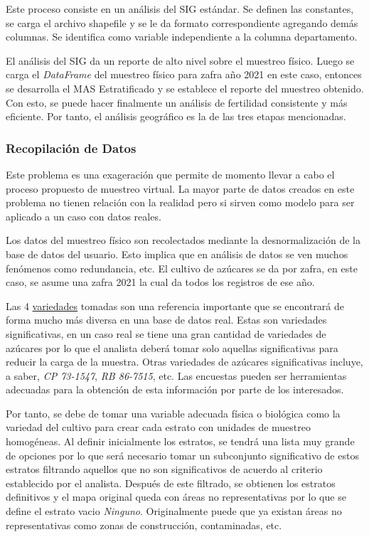 Este proceso consiste en un análisis del SIG estándar. Se definen las constantes, se carga el archivo shapefile y se le da formato correspondiente agregando demás columnas. Se identifica como variable independiente a la columna departamento.

\bigbreak

El análisis del SIG da un reporte de alto nivel sobre el muestreo físico. Luego se carga el \textit{DataFrame} del muestreo físico para zafra año 2021 en este caso, entonces se desarrolla el MAS Estratificado y se establece el reporte del muestreo obtenido. Con esto, se puede hacer finalmente un análisis de fertilidad consistente y más eficiente. Por tanto, el análisis geográfico es la de las tres etapas mencionadas.

\subsubsection{Recopilación de Datos}

Este problema es una exageración que permite de momento llevar a cabo el proceso propuesto de muestreo virtual. La mayor parte de datos creados en este problema no tienen relación con la realidad pero si sirven como modelo para ser aplicado a un caso con datos reales.

\bigbreak

Los datos del muestreo físico son recolectados mediante la desnormalización de la base de datos del usuario. Esto implica que en análisis de datos se ven muchos fenómenos como redundancia, etc. El cultivo de azúcares se da por zafra, en este caso, se asume una zafra 2021 la cual da todos los registros de ese año.

\bigbreak

Las 4 \href{https://www.gob.mx/conadesuca/es/articulos/variedades-de-cana-de-azucar?idiom=es}{variedades} tomadas son una referencia importante que se encontrará de forma mucho más diversa en una base de datos real. Estas son variedades significativas, en un caso real se tiene una gran cantidad de variedades de azúcares por lo que el analista deberá tomar solo aquellas significativas para reducir la carga de la muestra. Otras variedades de azúcares significativas incluye, a saber, \textit{CP 73-1547}, \textit{RB 86-7515}, etc. Las encuestas pueden ser herramientas adecuadas para la obtención de esta información por parte de los interesados.

\bigbreak

Por tanto, se debe de tomar una variable adecuada física o biológica como la variedad del cultivo para crear cada estrato con unidades de muestreo homogéneas. Al definir inicialmente los estratos, se tendrá una lista muy grande de opciones por lo que será necesario tomar un subconjunto significativo de estos estratos filtrando aquellos que no son significativos de acuerdo al criterio establecido por el analista. Después de este filtrado, se obtienen los estratos definitivos y el mapa original queda con áreas no representativas por lo que se define el estrato vacio \textit{Ninguno}. Originalmente puede que ya existan áreas no representativas como zonas de construcción, contaminadas, etc.

